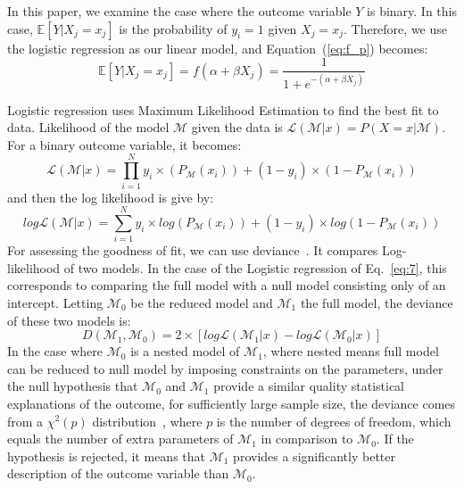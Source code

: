 \documentclass[letterpaper]{article} %
\begin{document}
In this paper, we examine the case where the outcome variable $Y$ is binary. In this case, $\mathbb{E}[Y|X_j = x_j]$ is the probability of $y_i = 1$ given $X_j = x_j$. Therefore, we use the logistic regression as our linear model, and Equation~(\ref{eq:f_p}) becomes:
\begin{equation}
\mathbb{E}[Y|X_j = x_j] = f(\alpha + \beta X_j) = \frac{1}{1 + e^{-(\alpha + \beta X_j)}}
\label{eq:7}
\end{equation}


Logistic regression uses Maximum Likelihood Estimation to find the best fit to data. Likelihood of the model $\mathcal{M}$ given the data is $\mathcal{L}(\mathcal{M} | x) = P(X = x | \mathcal{M})$. For a binary outcome variable, it becomes:
\begin{equation}
	\mathcal{L}(\mathcal{M} | x) = \prod_{i = 1}^{N} y_i \times (P_{\mathcal{M}}(x_i)) + (1 - y_i) \times (1 - P_{\mathcal{M}}(x_i))
	\label{eq:llg}
\end{equation}
and then the log likelihood is give by:
\begin{equation}
	log \mathcal{L}(\mathcal{M} | x) = \sum_{i = 1}^{N} y_i \times log(P_{\mathcal{M}}(x_i)) + (1 - y_i) \times log(1 - P_{\mathcal{M}}(x_i))
	\label{eq:lllg}
\end{equation}
For assessing the goodness of fit, we can use deviance~\cite{deviance}. It compares Log-likelihood of two models. In the case of the Logistic regression of Eq.~\ref{eq:7}, this corresponds to comparing the full model with a null model consisting only of an intercept.
Letting $\mathcal{M}_0$ be the reduced model and $\mathcal{M}_1$ the full model, the deviance of these two models is:
\begin{equation}
	D(\mathcal{M}_1, \mathcal{M}_0) = 2 \times [ log \mathcal{L}(\mathcal{M}_1 | x) - log \mathcal{L}(\mathcal{M}_0 | x) ]
	\label{eq:deviance}
\end{equation}
In the case where $\mathcal{M}_0$ is a nested model of $\mathcal{M}_1$, where nested means full model can be reduced to null model by imposing constraints on the parameters, under the null hypothesis that $\mathcal{M}_0$ and $\mathcal{M}_1$ provide a similar quality statistical explanations of the outcome,
for sufficiently large sample size, the deviance comes from a $\chi^2(p)$ distribution~\cite{deviance}, where $p$ is the number of degrees of freedom, which equals the number of extra parameters of $\mathcal{M}_1$ in comparison to $\mathcal{M}_0$. If the hypothesis is rejected, it means that $\mathcal{M}_1$ provides a significantly better description of the outcome variable than $\mathcal{M}_0$.
\end{document}
